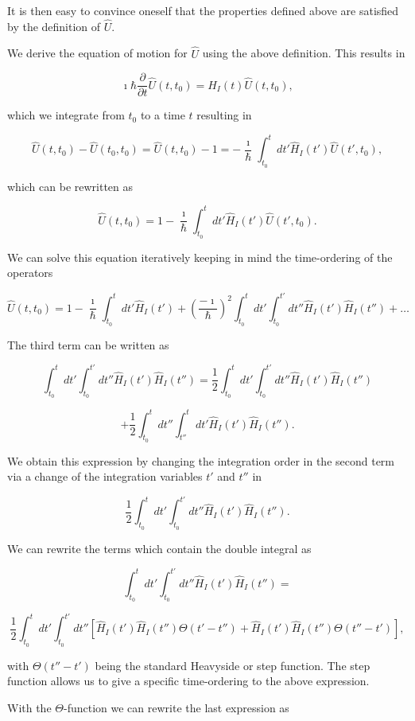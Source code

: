It is then easy to convince oneself that the properties defined above are satisfied by the definition of $\hat{U}$. 


We derive the equation of motion for $\hat{U}$ using the above definition.
This results in

\[
\imath \hbar\frac{\partial }{\partial t}\hat{U}(t,t_0) = \hat{H}_I(t)\hat{U}(t,t_0),
\]

which we integrate from $t_0$ to a time $t$ resulting in

\[
\hat{U}(t,t_0)-\hat{U}(t_0,t_0)=\hat{U}(t,t_0)-1=-\frac{\imath}{\hbar}\int_{t_0}^t dt' \hat{H}_I(t')\hat{U}(t',t_0),
\]

which can be rewritten as

\[
\hat{U}(t,t_0)=1-\frac{\imath}{\hbar}\int_{t_0}^t dt' \hat{H}_I(t')\hat{U}(t',t_0).
\]


We can solve this equation iteratively keeping in mind the time-ordering of the operators

\[
\hat{U}(t,t_0)=1-\frac{\imath}{\hbar}\int_{t_0}^t dt' \hat{H}_I(t')+\left(\frac{-\imath}{\hbar}\right)^2\int_{t_0}^t dt'\int_{t_0}^{t'} dt'' \hat{H}_I(t')\hat{H}_I(t'')+\dots
\]

The third term can be written as 

\[
\int_{t_0}^t dt'\int_{t_0}^{t'} dt'' \hat{H}_I(t')\hat{H}_I(t'')=
\frac{1}{2}\int_{t_0}^t dt'\int_{t_0}^{t'} dt'' \hat{H}_I(t')\hat{H}_I(t'')
\]


\[
+\frac{1}{2}\int_{t_0}^t dt''\int_{t''}^{t} dt' \hat{H}_I(t')\hat{H}_I(t'').
\]


We obtain this expression by changing the integration order in the second term
via a change of the integration variables $t'$ and $t''$  in 

\[
\frac{1}{2}\int_{t_0}^t dt'\int_{t_0}^{t'} dt'' \hat{H}_I(t')\hat{H}_I(t'').
\]

We can rewrite the terms which contain the double integral as

\[
\int_{t_0}^t dt'\int_{t_0}^{t'} dt'' \hat{H}_I(t')\hat{H}_I(t'')=
\]


\[
\frac{1}{2}\int_{t_0}^t dt'\int_{t_0}^{t'} dt''\left[\hat{H}_I(t')\hat{H}_I(t'')\Theta(t'-t'')
+\hat{H}_I(t')\hat{H}_I(t'')\Theta(t''-t')\right],
\]

with $\Theta(t''-t')$ being the standard Heavyside or step function. The step function allows us to give a specific time-ordering to the above expression.



With the $\Theta$-function we can rewrite the last expression as 

